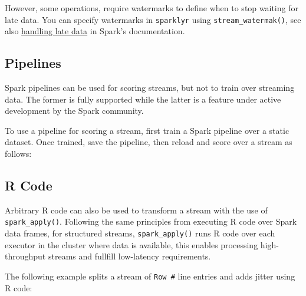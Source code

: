 \documentclass[]{book}
\newenvironment{Shaded}{\begin{snugshade}}{\end{snugshade}}
\newcommand{\KeywordTok}[1]{\textcolor[rgb]{0.13,0.29,0.53}{\textbf{#1}}}
\newcommand{\NormalTok}[1]{#1}
\newcommand{\OperatorTok}[1]{\textcolor[rgb]{0.81,0.36,0.00}{\textbf{#1}}}
\newcommand{\StringTok}[1]{\textcolor[rgb]{0.31,0.60,0.02}{#1}}
\theoremstyle{definition}
\theoremstyle{definition}
\theoremstyle{definition}
\theoremstyle{remark}
\begin{document}
However, some operations, require watermarks to define when to stop
waiting for late data. You can specify watermarks in \texttt{sparklyr}
using \texttt{stream\_watermak()}, see also
\href{https://spark.apache.org/docs/latest/structured-streaming-programming-guide.html\#handling-late-data-and-watermarking}{handling
late data} in Spark's documentation.

\hypertarget{streams-pipelines}{%
\subsection{Pipelines}\label{streams-pipelines}}

Spark pipelines can be used for scoring streams, but not to train over
streaming data. The former is fully supported while the latter is a
feature under active development by the Spark community.

To use a pipeline for scoring a stream, first train a Spark pipeline
over a static dataset. Once trained, save the pipeline, then reload and
score over a stream as follows:

\begin{Shaded}
\end{Shaded}

\hypertarget{streams-r}{%
\subsection{R Code}\label{streams-r}}

Arbitrary R code can also be used to transform a stream with the use of
\texttt{spark\_apply()}. Following the same principles from executing R
code over Spark data frames, for structured streams,
\texttt{spark\_apply()} runs R code over each executor in the cluster
where data is available, this enables processing high-throughput streams
and fullfill low-latency requirements.

The following example splits a stream of \texttt{Row\ \#} line entries
and adds jitter using R code:
\end{document}
